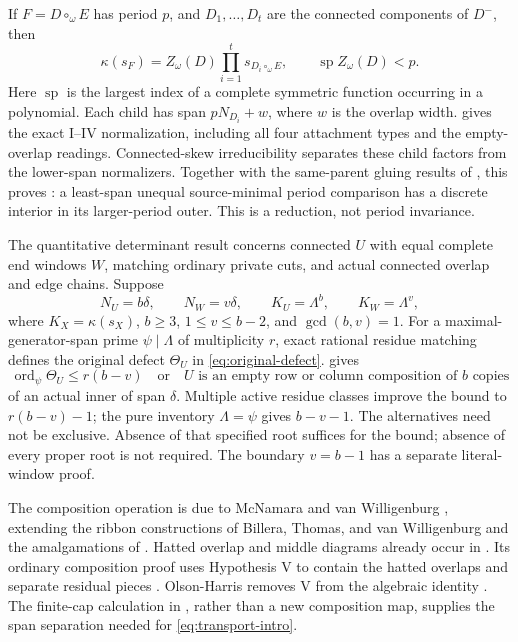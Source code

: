 \documentclass[11pt,a4paper]{amsart}
\numberwithin{equation}{section}
\theoremstyle{plain}
\theoremstyle{definition}
\begin{document}
If \(F=D\circ_\omega E\) has period \(p\), and \(D_1,\ldots,D_t\) are the connected components of \(D^-\), then
\begin{equation}\label{eq:transport-intro}
 \kappa(s_F)=Z_\omega(D)\prod_{i=1}^t s_{D_i\circ_\omega E},
 \qquad \operatorname{sp} Z_\omega(D)<p.
\end{equation}
Here \(\operatorname{sp}\) is the largest index of a complete symmetric function occurring in a polynomial.  Each child has span \(pN_{D_i}+w\), where \(w\) is the overlap width.   gives the exact I--IV normalization, including all four attachment types and the empty-overlap readings.  Connected-skew irreducibility separates these child factors from the lower-span normalizers.  Together with the same-parent gluing results of \cite{Shields2026Gluing}, this proves : a least-span unequal source-minimal period comparison has a discrete interior in its larger-period outer.  This is a reduction, not period invariance.

The quantitative determinant result concerns connected \(U\) with equal complete end windows \(W\), matching ordinary private cuts, and actual connected overlap and edge chains.  Suppose
\[
 N_U=b\delta,\qquad N_W=v\delta,\qquad
 K_U=\Lambda^b,\qquad K_W=\Lambda^v,
\]
where \(K_X=\kappa(s_X)\), \(b\ge3\), \(1\le v\le b-2\), and \(\gcd(b,v)=1\).  For a maximal-generator-span prime \(\psi\mid\Lambda\) of multiplicity \(r\), exact rational residue matching defines the original defect \(\Theta_U\) in \eqref{eq:original-defect}.   gives
\[
 \operatorname{ord}_\psi\Theta_U\le r(b-v)
 \quad\text{or}\quad
 U\text{ is an empty row or column composition of }b\text{ copies}
\]
of an actual inner of span \(\delta\).  Multiple active residue classes improve the bound to \(r(b-v)-1\); the pure inventory \(\Lambda=\psi\) gives \(b-v-1\).  The alternatives need not be exclusive.  Absence of that specified root suffices for the bound; absence of every proper root is not required.  The boundary \(v=b-1\) has a separate literal-window proof.

The composition operation is due to McNamara and van Willigenburg \cite{McNamara2009Classification}, extending the ribbon constructions of Billera, Thomas, and van Willigenburg \cite{Billera2006DecomposableCompositions} and the amalgamations of \cite{Reiner2007Coincidences}.  Hatted overlap and middle diagrams already occur in \cite[\S4]{McNamara2009Classification}.  Its ordinary composition proof uses Hypothesis V to contain the hatted overlaps and separate residual pieces \cite[pp.~4457 and~4461]{McNamara2009Classification}.  Olson-Harris removes V from the algebraic identity \cite[Thms.~5.6.1 and~5.6.4]{OlsonHarris2024HopfApplications}.  The finite-cap calculation in , rather than a new composition map, supplies the span separation needed for \eqref{eq:transport-intro}.
\end{document}
